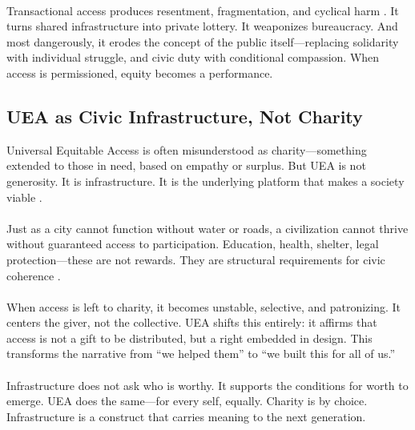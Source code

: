 \documentclass[12pt]{article}
\begin{document}
\paragraph{}Transactional access produces resentment, fragmentation, and cyclical harm \cite{taylor2004modernsocialimaginaries}. It turns shared infrastructure into private lottery. It weaponizes bureaucracy. And most dangerously, it erodes the concept of the public itself—replacing solidarity with individual struggle, and civic duty with conditional compassion. When access is permissioned, equity becomes a performance.

\subsection{UEA as Civic Infrastructure, Not Charity}

Universal Equitable Access is often misunderstood as charity—something extended to those in need, based on empathy or surplus. But UEA is not generosity. It is infrastructure. It is the underlying platform that makes a society viable \cite{lubell2015governing}.

\paragraph{}Just as a city cannot function without water or roads, a civilization cannot thrive without guaranteed access to participation. Education, health, shelter, legal protection—these are not rewards. They are structural requirements for civic coherence \cite{sen1999development}.

\paragraph{}When access is left to charity, it becomes unstable, selective, and patronizing. It centers the giver, not the collective. UEA shifts this entirely: it affirms that access is not a gift to be distributed, but a right embedded in design. This transforms the narrative from “we helped them” to “we built this for all of us.”

\paragraph{}Infrastructure does not ask who is worthy. It supports the conditions for worth to emerge. UEA does the same—for every self, equally. Charity is by choice. Infrastructure is a construct that carries meaning to the next generation.
\end{document}
